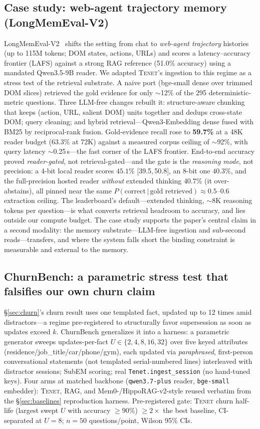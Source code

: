 \documentclass[11pt]{article}
\newcommand{\tenet}{\textsc{Tenet}}
\newcommand{\ci}[2]{{\footnotesize[#1,\,#2]}}
\begin{document}
\subsection{Case study: web-agent trajectory memory (LongMemEval-V2)}\label{sec:lmev2}
LongMemEval-V2~\cite{lmev2} shifts the setting from chat to \emph{web-agent trajectory}
histories (up to 115M tokens; DOM states, actions, URLs) and scores a latency--accuracy
frontier (LAFS) against a strong RAG reference (51.0\% accuracy) using a mandated
Qwen3.5-9B reader. We adapted \tenet{}'s ingestion to this regime as a stress test of
the retrieval substrate. A naive port (bge-small dense over trimmed DOM slices)
retrieved the gold evidence for only $\sim$12\% of the 295 deterministic-metric
questions. Three LLM-free changes rebuilt it: structure-aware chunking that keeps
(action, URL, salient DOM) units together and dedups cross-state DOM; query cleaning;
and hybrid retrieval---Qwen3-Embedding dense fused with BM25 by reciprocal-rank fusion.
Gold-evidence recall rose to \textbf{59.7\%} at a 48K reader budget (63.3\% at 72K)
against a measured corpus ceiling of $\sim$92\%, with query latency $\sim$0.25\,s---the
fast corner of the LAFS frontier. End-to-end accuracy proved \emph{reader-gated}, not
retrieval-gated---and the gate is the \emph{reasoning mode}, not precision: a 4-bit
local reader scores $45.1\%$ \ci{39.5}{50.8}, an 8-bit one $40.3\%$, and the
full-precision hosted reader \emph{without} extended thinking $40.7\%$ (it
over-abstains), all pinned near the same
$P(\text{correct}\,|\,\text{gold retrieved})\approx0.5$--$0.6$ extraction ceiling.
The leaderboard's default---extended thinking, $\sim$8K reasoning tokens per
question---is what converts retrieval headroom to accuracy, and lies outside our
compute budget. The
case study supports the paper's central claim in a second modality: the memory
substrate---LLM-free ingestion and sub-second reads---transfers, and where the system
falls short the binding constraint is measurable and external to the memory.

\subsection{ChurnBench: a parametric stress test that falsifies our own churn claim}\label{sec:churnbench}
\S\ref{sec:churn}'s churn result uses one templated fact, updated up to 12 times amid
distractors---a regime pre-registered to structurally favor supersession as soon as
updates exceed $k$. ChurnBench generalizes it into a harness: a parametric generator
sweeps updates-per-fact $U\in\{2,4,8,16,32\}$ over five keyed attributes
(residence/job\_title/car/phone/gym), each updated via \emph{paraphrased}, first-person
conversational statements (not templated serial-numbered lines) interleaved with
distractor sessions; SubEM scoring; real \texttt{Tenet.ingest\_session} (no hand-tuned
keys). Four arms at matched backbone (\texttt{qwen3.7-plus} reader,
\texttt{bge-small} embedder): \tenet{}, RAG, and Mem0-/HippoRAG-v2-style reused verbatim
from the \S\ref{sec:baselines} reproduction harness. Pre-registered gate: \tenet{}
churn half-life (largest swept $U$ with accuracy $\geq90\%$) $\geq2\times$ the best
baseline, CI-separated at $U{=}8$; $n{=}50$ questions/point, Wilson 95\% CIs.
\end{document}
